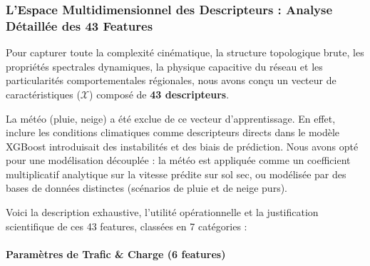 \documentclass[11pt, a4paper]{article}
\begin{document}
\subsubsection{L'Espace Multidimensionnel des Descripteurs : Analyse
Détaillée des 43
Features}\label{lespace-multidimensionnel-des-descripteurs-analyse-duxe9tailluxe9e-des-43-features}

Pour capturer toute la complexité cinématique, la structure topologique
brute, les propriétés spectrales dynamiques, la physique capacitive du
réseau et les particularités comportementales régionales, nous avons
conçu un vecteur de caractéristiques (\(\mathcal{X}\)) composé de
\textbf{43 descripteurs}.

La météo (pluie, neige) a été exclue de ce vecteur d'apprentissage. En
effet, inclure les conditions climatiques comme descripteurs directs
dans le modèle XGBoost introduisait des instabilités et des biais de
prédiction. Nous avons opté pour une modélisation découplée : la météo
est appliquée comme un coefficient multiplicatif analytique sur la
vitesse prédite sur sol sec, ou modélisée par des bases de données
distinctes (scénarios de pluie et de neige purs).

Voici la description exhaustive, l'utilité opérationnelle et la
justification scientifique de ces 43 features, classées en 7 catégories
:

\paragraph{Paramètres de Trafic \& Charge (6
features)}\label{paramuxe8tres-de-trafic-charge-6-features}
\end{document}
